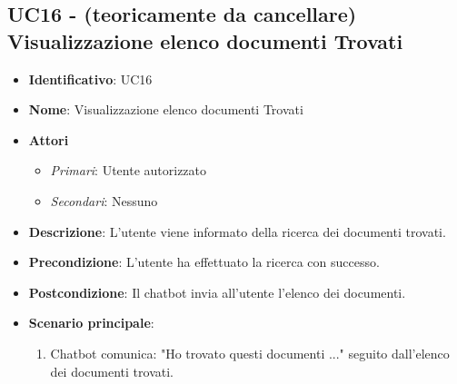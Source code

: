 \subsection{UC16 - (teoricamente da cancellare) Visualizzazione elenco documenti Trovati }
\begin{itemize}
	\item \textbf{Identificativo}: UC16
	\item \textbf{Nome}: Visualizzazione elenco documenti Trovati
	\item \textbf{Attori}
	\begin{itemize} 
		\item \textit{Primari}: Utente autorizzato
		\item \textit{Secondari}: Nessuno
	\end{itemize}
	\item \textbf{Descrizione}: L'utente viene informato della ricerca dei documenti trovati.
	\item \textbf{Precondizione}: L'utente ha effettuato la ricerca con successo.
	\item \textbf{Postcondizione}: Il chatbot invia all'utente l'elenco dei documenti.
	\item \textbf{Scenario principale}: \begin{enumerate}
		\item Chatbot comunica: "Ho trovato questi documenti ..." seguito dall'elenco dei documenti trovati.
	\end{enumerate}
\end{itemize}